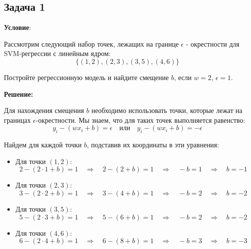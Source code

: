 \subsection{Задача 1}
\textbf{Условие}:
\par Рассмотрим следующий набор точек, лежащих на границе \(\epsilon\) - окрестности для SVM-регрессии с линейным ядром:
\begin{equation*}
    \{(1, 2), (2, 3), (3, 5), (4, 6)\}
\end{equation*}
\par Постройте регрессионную модель и найдите смещение \(b\), если \(w = 2\), \(\epsilon = 1\).
\par \noindent \textbf{Решение:}
\par Для нахождения смещения \(b\) необходимо использовать точки, которые лежат на границах \(\epsilon\)-окрестности. Мы знаем, что для таких точек выполняется равенство:
\begin{equation*}
    y_i - (w x_i + b) = \epsilon \quad \text{или} \quad y_i - (w x_i + b) = -\epsilon
\end{equation*}
\par Найдем для каждой точки \(b\), подставив их координаты в эти уравнения:
\begin{itemize}
\item Для точки \((1, 2)\):
\begin{equation*}
    2 - (2 \cdot 1 + b) = 1 \quad \Rightarrow \quad 2 - (2 + b) = 1 \quad \Rightarrow \quad -b = 1 \quad \Rightarrow \quad b = -1
\end{equation*}
\item Для точки \((2, 3)\):
\begin{equation*}
    3 - (2 \cdot 2 + b) = 1 \quad \Rightarrow \quad 3 - (4 + b) = 1 \quad \Rightarrow \quad -b = 2 \quad \Rightarrow \quad b = -2
\end{equation*}
\item Для точки \((3, 5)\):
\begin{equation*}
    5 - (2 \cdot 3 + b) = 1 \quad \Rightarrow \quad 5 - (6 + b) = 1 \quad \Rightarrow \quad -b = 2 \quad \Rightarrow \quad b = -2
\end{equation*}
\item Для точки \((4, 6)\):
\begin{equation*}
    6 - (2 \cdot 4 + b) = 1 \quad \Rightarrow \quad 6 - (8 + b) = 1 \quad \Rightarrow \quad -b = 3 \quad \Rightarrow \quad b = -3
\end{equation*}
\end{itemize}
